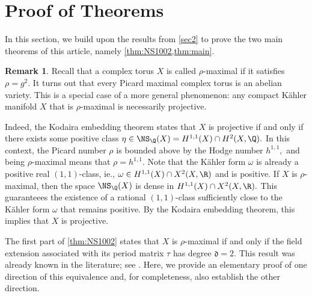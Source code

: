 \documentclass[11pt,leqno]{article}
\theoremstyle{definition}
\newtheorem{remark}{Remark}[section]
\begin{document}
\section{Proof of Theorems}
\label{sec3}
In this section, we build upon the results from \cref{sec2} to prove the two main theorems of this article, namely \cref{thm:NS1002,thm:main}. 


\begin{remark}
\label{rem:Kodaira}
Recall that a complex torus $X$ is called $\rho$-maximal if it satisfies $\rho=g^2.$ It turns out that every Picard maximal complex torus is an abelian variety. This is a special case of a more general phenomenon: any compact K\"{a}hler manifold $X$ that is $\rho$-maximal is necessarily projective. 

Indeed, the Kodaira embedding theorem states that $X$ is projective if and only if there exists some positive class $\eta\in\NS_{\Q}(X)=H^{1,1}(X)\cap H^2(X,\Q).$ In this context, the Picard number $\rho$ is bounded above by the Hodge number $h^{1,1},$ and being $\rho$-maximal means that $\rho=h^{1,1}.$ Note that the K\"{a}hler form $\omega$ is already a positive real $(1,1)$-class, ie., $\omega\in H^{1,1}(X)\cap X^2(X,\R)$ and is positive. If $X$ is $\rho$-maximal, then the space $\NS_{\Q}(X)$ is dense in $H^{1,1}(X)\cap X^2(X,\R).$ This guaranteees the existence of a rational $(1,1)$-class sufficiently close to the K\"{a}hler form $\omega$ that remains positive. By the Kodaira embedding theorem, this implies that $X$ is projective.      
\end{remark}

The first part of \cref{thm:NS1002}  states that $X$ is $\rho$-maximal if and only if the field extension associated with its period matrix $\tau$ has degree $\mathfrak{d}=2.$ This result was already known in the literature; see \cite[Exercise 5.6.10]{birkenhake2004complex}. Here, we provide an elementary proof of one direction of this equivalence and, for completeness,  also establish the other direction. \\
\end{document}
